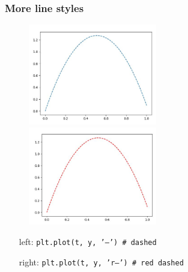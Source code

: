 \documentclass[14pt]{beamer}
\begin{document}
\begin{frame}[fragile]
\frametitle{More line styles}

\begin{figure}[ht]
	\centering
	\includegraphics[width=0.5\textwidth]{figures/LLp23coutput}%
	\includegraphics[width=0.5\textwidth]{figures/LLp23doutput}
\end{figure}
\vspace*{-8mm}
\begin{itemize}
	\item[left:] \texttt{plt.plot(t, y, '--') \# dashed}
	\item[right:] \texttt{plt.plot(t, y, 'r--') \# red dashed}
\end{itemize}

\end{frame}

\end{document}
